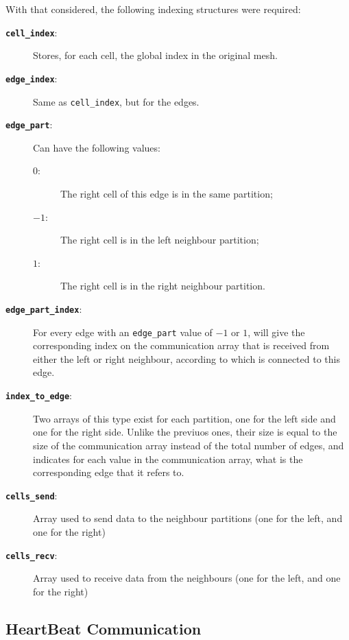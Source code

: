 With that considered, the following indexing structures were required:
\begin{description}

	\item[\textbf\texttt{cell\_index}:] Stores, for each cell, the global index in the original mesh.
	\item[\textbf\texttt{edge\_index}:] Same as \texttt{cell\_index}, but for the edges.

	\item[\textbf\texttt{edge\_part}:] Can have the following values:
		\begin{description}
			\item[$0$:]  The right cell of this edge is in the same partition;
			\item[$-1$:] The right cell is in the left neighbour partition;
			\item[$1$:]  The right cell is in the right neighbour partition.
		\end{description}

	\item[\textbf\texttt{edge\_part\_index}:] For every edge with an \texttt{edge\_part} value of $-1$ or $1$, will give the corresponding index on the communication array that is received from either the left or right neighbour, according to which is connected to this edge.

	\item[\textbf\texttt{index\_to\_edge}:] Two arrays of this type exist for each partition, one for the left side and one for the right side. Unlike the previuos ones, their size is equal to the size of the communication array instead of the total number of edges, and indicates for each value in the communication array, what is the corresponding edge that it refers to.

	\item[\textbf\texttt{cells\_send}:] Array used to send data to the neighbour partitions (one for the left, and one for the right)
	\item[\textbf\texttt{cells\_recv}:] Array used to receive data from the neighbours (one for the left, and one for the right)

\end{description}

\subsection{HeartBeat Communication}
\label{subsec:heartbeat_comm}

